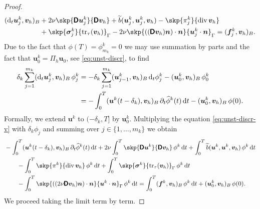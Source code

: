 \documentclass[reqno,a4paper]{amsart}
\def\tens#1{\pmb{\mathsf{#1}}}
\def\vec#1{\boldsymbol{#1}}
\def\tr{\mathop{\mathrm{tr}}\nolimits}
\def\diver{\mathop{\mathrm{div}}\nolimits} %
\def\d{{\rm d}}
\def\dt{\,\d t}
\def\difft{\d_t}
\def\bf{\vec{f}}
\def\bn{\vec{n}}
\def\bu{\vec{u}}
\def\bv{\vec{v}}
\def\bsigma{\vec{\sigma}}
\def\BD{\tens{D}}
\begin{document}
\begin{proof}
\begin{equation}
\begin{aligned}
			(\difft {\bu}^{k}_j,{\bv}_h)_B
			&+ 2\nu \skp{ \BD \bu^{k}_j}{ \BD \bv_h } 
			+ \widetilde{b}(\bu^{k}_j, \bu^{k}_j, \bv_h)
			- \skp{ \pi_j^{k}}{ \diver \bv_h } 
			\\
			& 
			+ \skp{ \bsigma^k_j}{\tr_{\tau}(\bv_h) }_{\Gamma}
			- 2 \nu \skp{   \left(( \BD \bv_h) \bn \right) \cdot \bn }{ \bu_j^{k} \cdot \bn }_{\Gamma}
			= ({\bf}_j^k ,{\bv}_h )_B.
		\end{aligned}
	\end{equation} 
	Due to the fact that $\phi(T) = \phi^k_{m_k} = 0$ we may use summation by parts and the fact that $ \bu^k_0 =  \Pi_h  \bu_0$, see \eqref{eq:unst-discr},  to find 
	\begin{equation}\label{eq:unst-lim-1-a}
		\begin{aligned}
			\delta_k	\sum_{j= 1}^{m_k} (\difft  {\bu}^{k}_j,{\bv}_h)_B \,\phi_j^k 
			& =
			-	\delta_k \sum_{j= 1}^{m_k} (  {\bu}^{k}_{j-1},{\bv}_h)_B\, \difft  \phi_{j}^k 
			- ( \bu^k_0,  \bv_h)_B\,\phi_0^k \\
			& = -  \int_0^T ( \bu^k(t-\delta_k),  \bv_h)_B \,\partial_t \widehat{\phi}^k(t) \dt 
			- ( \bu^k_0,  \bv_h)_B\,\phi(0). 
		\end{aligned}
	\end{equation}
	Formally, we extend $\bu^k$ to $(-\delta_k,T]$ by $\bu^k_0$. 
	Multiplying the equation \eqref{eq:unst-discr-v} with $\delta_k \phi_j$ and summing over $j \in \{1, \ldots, m_k\} $ we obtain 
	\begin{equation}
		\begin{aligned}	\label{eq:unst-discr-v2}
			&-  \int_0^T ( \bu^k(t-\delta_k),  \bv_h)_B \,\partial_t \widehat{\phi}^k(t) \dt 
			+ 2\nu \int_0^T \skp{ \BD \bu^{k}}{ \BD \bv_h }\, \phi^k \dt 
			+ \int_0^T \widetilde{b}(\bu^{k}, \bu^{k}, \bv_h) \, \phi^k \dt 
			\\
			& \qquad 
			- \int_0^T \skp{ \pi^{k}}{ \diver \bv_h }\, \phi^k \dt  
			+ \int_0^T \skp{
				\bsigma^k 
			}{\tr_{\tau}(\bv_h) }_{\Gamma} \, \phi^k \dt \\
			& \qquad
			- \int_0^T \skp{   \left((2 \nu \BD \bv_h) \bn \right) \cdot \bn }{ \bu^{k} \cdot \bn }_{\Gamma}\, \phi^k \dt 
			= \int_0^T ({\bf}^k ,{\bv}_h )_B \, \phi^k \dt 
			+ 	( \bu^k_0,  \bv_h)_B\,\phi(0).
		\end{aligned}
	\end{equation} 
	We proceed taking the limit term by term. 
	

\end{proof}
\end{document}
